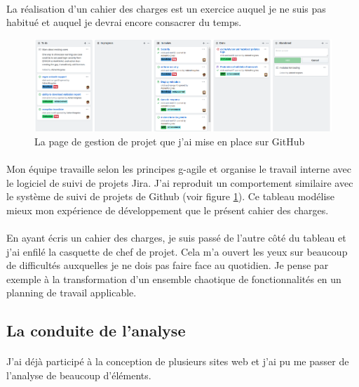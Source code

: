 \paragraph{}
La réalisation d'un cahier des charges est un exercice auquel je ne suis pas habitué et auquel je devrai encore consacrer du temps.

\begin{figure}[ht]
    \centering
    \includegraphics[width=1\textwidth]{images/github-project.png}
    \caption{La page de gestion de projet que j'ai mise en place sur GitHub}
    \label{fig:github-project}
\end{figure}

\paragraph{}
Mon équipe travaille selon les principes \gls{g-agile} et organise le travail interne avec le logiciel de suivi de projets Jira.
J'ai reproduit un comportement similaire avec le système de suivi de projets de Github (voir figure \ref{fig:github-project}).
Ce tableau modélise mieux mon expérience de développement que le présent cahier des charges.

\paragraph{}
En ayant écris un cahier des charges, je suis passé de l'autre côté du tableau et j'ai enfilé la casquette de chef de projet.
Cela m'a ouvert les yeux sur beaucoup de difficultés auxquelles je ne dois pas faire face au quotidien.
Je pense par exemple à la transformation d'un ensemble chaotique de fonctionnalités en un planning de travail applicable.

\subsection{La conduite de l'analyse}
\label{subsec:analyse-is-hard}

\paragraph{}
J'ai déjà participé à la conception de plusieurs sites web et j'ai pu me passer de l'analyse de beaucoup d'éléments.


